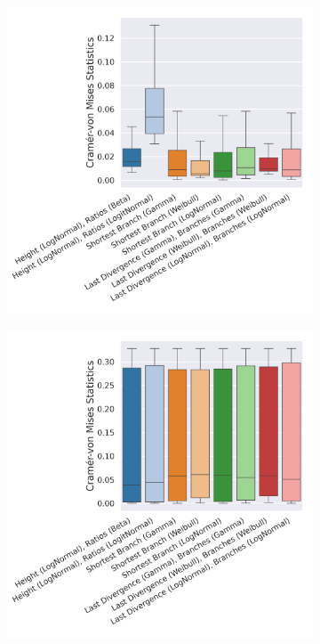\documentclass[10pt,letterpaper]{article}
\begin{document}
\begin{figure}
	\begin{subfigure}[b]{0.4\textwidth}
		\centering
		\includegraphics[width=\textwidth]{figures/yule-400-ccd1-cvm.png}
	\end{subfigure}
	\begin{subfigure}[b]{0.4\textwidth}
		\centering
		\includegraphics[width=\textwidth]{figures/bio-ccd1-cvm.png}
	\end{subfigure}
	
	\label{fig:cramer-von-mises}
\end{figure}
\end{document}
